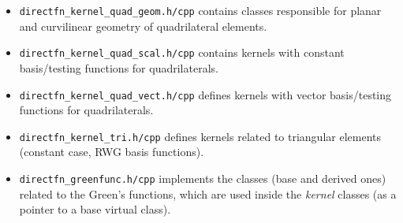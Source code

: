 \documentclass[a4wide,11pt]{article}
\renewcommand{\[}{\begin{equation}}
\renewcommand{\]}{\end{equation}}
\renewcommand{\{}{\begin{eqnarray}}
\renewcommand{\}}{\end{eqnarray}}
\begin{document}
\begin{itemize}
\item \texttt{directfn\_kernel\_quad\_geom.h/cpp} contains classes
responsible for planar and curvilinear geometry of quadrilateral elements.
	
\item \texttt{directfn\_kernel\_quad\_scal.h/cpp} contains kernels with constant basis/testing functions for quadrilaterals.

\item \texttt{directfn\_kernel\_quad\_vect.h/cpp} defines kernels with vector basis/testing functions for quadrilaterals.

\item \texttt{directfn\_kernel\_tri.h/cpp} defines kernels related to triangular elements (constant case, RWG basis functions).

\item \texttt{directfn\_greenfunc.h/cpp} implements the classes (base and derived ones) 
related to the  Green's functions, which are used inside the \emph{kernel} classes (as a pointer to a base virtual class).

\end{itemize}




\end{document}
